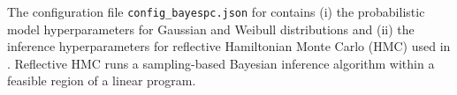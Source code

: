 The configuration file \texttt{config\_bayespc.json} for \BayesPC{} contains (i)
the probabilistic model hyperparameters for Gaussian and Weibull distributions
and (ii) the inference hyperparameters for reflective Hamiltonian Monte Carlo
(HMC) used in \BayesWC{}.
%
Reflective HMC runs a sampling-based Bayesian inference algorithm within a
feasible region of a linear program.


